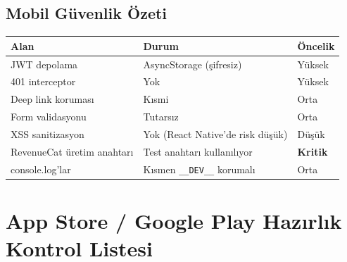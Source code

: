 \documentclass[12pt,a4paper]{article}
\begin{document}
\subsection*{Mobil Güvenlik Özeti}

\begin{tabularx}{\textwidth}{lXl}
\toprule
\textbf{Alan} & \textbf{Durum} & \textbf{Öncelik} \\
\midrule
JWT depolama & AsyncStorage (şifresiz) & Yüksek \\
401 interceptor & Yok & Yüksek \\
Deep link koruması & Kısmi & Orta \\
Form validasyonu & Tutarsız & Orta \\
XSS sanitizasyon & Yok (React Native'de risk düşük) & Düşük \\
RevenueCat üretim anahtarı & Test anahtarı kullanılıyor & \textbf{Kritik} \\
console.log'lar & Kısmen \texttt{\_\_DEV\_\_} korumalı & Orta \\
\bottomrule
\end{tabularx}

\section{App Store / Google Play Hazırlık Kontrol Listesi}
\end{document}
